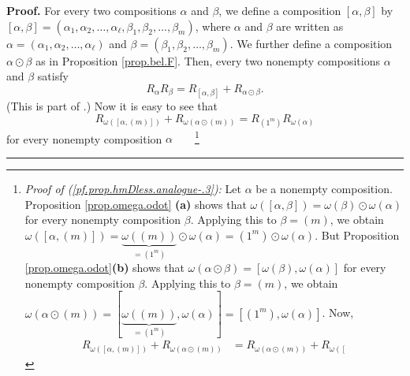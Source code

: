 \documentclass[numbers=enddot,12pt,final,onecolumn,notitlepage,abstracton]{scrartcl}%
\theoremstyle{definition}
\newenvironment{proof}[1][Proof]{\noindent\textbf{#1.} }{\ \rule{0.5em}{0.5em}}
\newenvironment{verlong}{}{}
\begin{document}
\begin{verlong}
\begin{proof}
For every two compositions $\alpha$ and $\beta$, we define a composition
$\left[  \alpha,\beta\right]  $ by $\left[  \alpha,\beta\right]  =\left(
\alpha_{1},\alpha_{2},\ldots,\alpha_{\ell},\beta_{1},\beta_{2},\ldots
,\beta_{m}\right)  $, where $\alpha$ and $\beta$ are written as $\alpha
=\left(  \alpha_{1},\alpha_{2},\ldots,\alpha_{\ell}\right)  $ and
$\beta=\left(  \beta_{1},\beta_{2},\ldots,\beta_{m}\right)  $. We further
define a composition $\alpha\odot\beta$ as in Proposition \ref{prop.bel.F}.
Then, every two nonempty compositions $\alpha$ and $\beta$ satisfy%
\begin{equation}
R_{\alpha}R_{\beta}=R_{\left[  \alpha,\beta\right]  }+R_{\alpha\odot\beta}.
\label{pf.prop.hmDless.analogue-.2}%
\end{equation}
(This is part of \cite[Theorem 5.4.10(c)]{Reiner}.) Now it is easy to see that%
\begin{equation}
R_{\omega\left(  \left[  \alpha,\left(  m\right)  \right]  \right)
}+R_{\omega\left(  \alpha\odot\left(  m\right)  \right)  }=R_{\left(
1^{m}\right)  }R_{\omega\left(  \alpha\right)  }
\label{pf.prop.hmDless.analogue-.3}%
\end{equation}
for every nonempty composition $\alpha$\ \ \ \ \footnote{\textit{Proof of
(\ref{pf.prop.hmDless.analogue-.3}):} Let $\alpha$ be a nonempty composition.
Proposition \ref{prop.omega.odot} \textbf{(a)} shows that $\omega\left(
\left[  \alpha,\beta\right]  \right)  =\omega\left(  \beta\right)  \odot
\omega\left(  \alpha\right)  $ for every nonempty composition $\beta$.
Applying this to $\beta=\left(  m\right)  $, we obtain $\omega\left(  \left[
\alpha,\left(  m\right)  \right]  \right)  =\underbrace{\omega\left(  \left(
m\right)  \right)  }_{=\left(  1^{m}\right)  }\odot\omega\left(
\alpha\right)  =\left(  1^{m}\right)  \odot\omega\left(  \alpha\right)  $. But
Proposition \ref{prop.omega.odot}\textbf{(b)} shows that $\omega\left(
\alpha\odot\beta\right)  =\left[  \omega\left(  \beta\right)  ,\omega\left(
\alpha\right)  \right]  $ for every nonempty composition $\beta$. Applying
this to $\beta=\left(  m\right)  $, we obtain $\omega\left(  \alpha
\odot\left(  m\right)  \right)  =\left[  \underbrace{\omega\left(  \left(
m\right)  \right)  }_{=\left(  1^{m}\right)  },\omega\left(  \alpha\right)
\right]  =\left[  \left(  1^{m}\right)  ,\omega\left(  \alpha\right)  \right]
$. Now,%
\begin{align*}
R_{\omega\left(  \left[  \alpha,\left(  m\right)  \right]  \right)
}+R_{\omega\left(  \alpha\odot\left(  m\right)  \right)  }  &  =R_{\omega
\left(  \alpha\odot\left(  m\right)  \right)  }+R_{\omega\left(  \left[
}
\end{align*}}
\end{proof}
\end{verlong}
\end{document}
